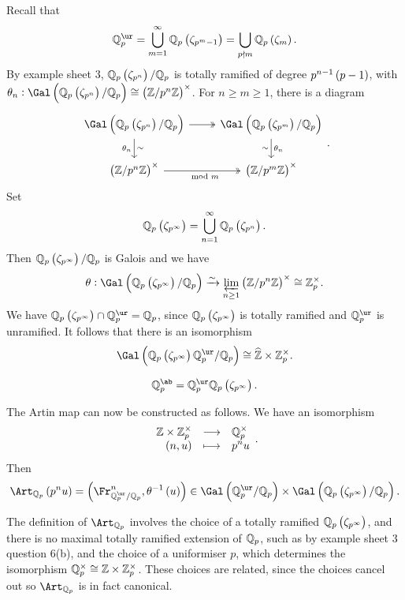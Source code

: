 Recall that
$$ \QQ_p^{\ur} = \bigcup_{m = 1}^\infty \QQ_p\br{\zeta_{p^m - 1}} = \bigcup_{p \nmid m} \QQ_p\br{\zeta_m}. $$
By example sheet $ 3 $, $ \QQ_p\br{\zeta_{p^n}} / \QQ_p $ is totally ramified of degree $ p^{n - 1}\br{p - 1} $, with $ \theta_n : \Gal\br{\QQ_p\br{\zeta_{p^n}} / \QQ_p} \cong \br{\ZZ / p^n\ZZ}^\times $. For $ n \ge m \ge 1 $, there is a diagram
$$
\begin{tikzcd}
\Gal\br{\QQ_p\br{\zeta_{p^n}} / \QQ_p} \arrow[twoheadrightarrow]{r} \arrow{d}{\sim}[swap]{\theta_n} & \Gal\br{\QQ_p\br{\zeta_{p^m}} / \QQ_p} \arrow{d}{\theta_n}[swap]{\sim} \\
\br{\ZZ / p^n\ZZ}^\times \arrow[twoheadrightarrow]{r}[swap]{\mod m} & \br{\ZZ / p^m\ZZ}^\times
\end{tikzcd}.
$$
Set
$$ \QQ_p\br{\zeta_{p^\infty}} = \bigcup_{n = 1}^\infty \QQ_p\br{\zeta_{p^n}}. $$
Then $ \QQ_p\br{\zeta_{p^\infty}} / \QQ_p $ is Galois and we have
$$ \theta : \Gal\br{\QQ_p\br{\zeta_{p^\infty}} / \QQ_p} \xrightarrow{\sim} \varprojlim_{n \ge 1} \br{\ZZ / p^n\ZZ}^\times \cong \ZZ_p^\times. $$
We have $ \QQ_p\br{\zeta_{p^\infty}} \cap \QQ_p^{\ur} = \QQ_p $, since $ \QQ_p\br{\zeta_{p^\infty}} $ is totally ramified and $ \QQ_p^{\ur} $ is unramified. It follows that there is an isomorphism
$$ \Gal\br{\QQ_p\br{\zeta_{p^\infty}}\QQ_p^{\ur} / \QQ_p} \cong \widehat{\ZZ} \times \ZZ_p^\times. $$

\begin{theorem}
\label{thm:19.5}
$$ \QQ_p^{\ab} = \QQ_p^{\ur}\QQ_p\br{\zeta_{p^\infty}}. $$
\end{theorem}

\pagebreak

The Artin map can now be constructed as follows. We have an isomorphism
$$ \function{\ZZ \times \ZZ_p^\times}{\QQ_p^\times}{\br{n, u}}{p^nu}. $$
Then
$$ \Art_{\QQ_p}\br{p^nu} = \br{\Fr_{\QQ_p^{\ur} / \QQ_p}^n, \theta^{-1}\br{u}} \in \Gal\br{\QQ_p^{\ur} / \QQ_p} \times \Gal\br{\QQ_p\br{\zeta_{p^\infty}} / \QQ_p}. $$

\begin{remark*}
The definition of $ \Art_{\QQ_p} $ involves the choice of a totally ramified $ \QQ_p\br{\zeta_{p^\infty}} $, and there is no maximal totally ramified extension of $ \mathbb{Q}_p $, such as by example sheet $ 3 $ question $ 6 $(b), and the choice of a uniformiser $ p $, which determines the isomorphism $ \mathbb{Q}_p^\times \cong \mathbb{Z} \times \mathbb{Z}_p^\times $. These choices are related, since the choices cancel out so $ \Art_{\QQ_p} $ is in fact canonical.
\end{remark*}

